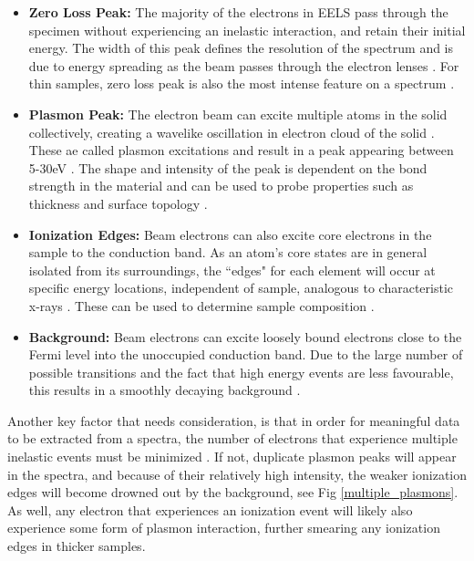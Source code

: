 \begin{itemize}
	\item \textbf{Zero Loss Peak:} The majority of the electrons in EELS pass through the specimen without experiencing an inelastic interaction, and retain their initial energy.  The width of this peak defines the resolution of the spectrum and is due to energy spreading as the beam passes through the electron lenses \cite{colliex_illustrated_1985}.  For thin samples, zero loss peak is also the most intense feature on a spectrum \cite{Egerton}.  
	
	\item \textbf{Plasmon Peak:}  The electron beam can excite multiple atoms in the solid collectively, creating a wavelike oscillation in electron cloud of the solid \cite{Egerton}.  These ae called plasmon excitations and result in a peak appearing between 5-30eV \cite{Egerton}.  The shape and intensity of the peak is dependent on the bond strength in the material and can be used to probe properties such as thickness and surface topology \cite{malis_eels_1988,nelayah_mapping_2007}. 
	
	\item \textbf{Ionization Edges:} Beam electrons can also excite core electrons in the sample to the conduction band.  As an atom's core states are in general isolated from its surroundings, the ``edges" for each element will occur at specific energy locations, independent of sample, analogous to characteristic x-rays \cite{Egerton}. These can be used to determine sample composition \cite{Egerton}.  
	
	\item  \textbf{Background:} Beam electrons can excite loosely bound electrons close to the Fermi level into the unoccupied conduction band.  Due to the large number of possible transitions and the fact that high energy events are less favourable, this results in a smoothly decaying background \cite{Egerton}.

	
\end{itemize}


Another key factor that needs consideration, is that in order for meaningful data to be extracted from a spectra, the number of electrons that experience multiple inelastic events must be minimized \cite{Egerton}.  If not, duplicate plasmon peaks will appear in the spectra, and because of their relatively high intensity, the weaker ionization edges will become drowned out by the background, see Fig \ref{multiple_plasmons}. As well, any electron that experiences an ionization event will likely also experience some form of plasmon interaction, further smearing any ionization edges in thicker samples.  

